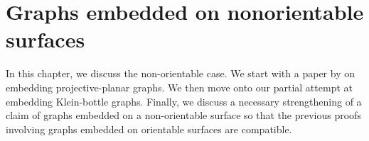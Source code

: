 \chapter{Graphs embedded on nonorientable surfaces}

In this chapter, we discuss the non-orientable case. We start with a paper by \textcite{nakamotoBookEmbeddingProjectiveplanar2015} on embedding projective-planar graphs. We then move onto our partial attempt at embedding Klein-bottle graphs. Finally, we discuss a necessary strengthening of a claim of graphs embedded on a non-orientable surface so that the previous proofs involving graphs embedded on orientable surfaces are compatible.







